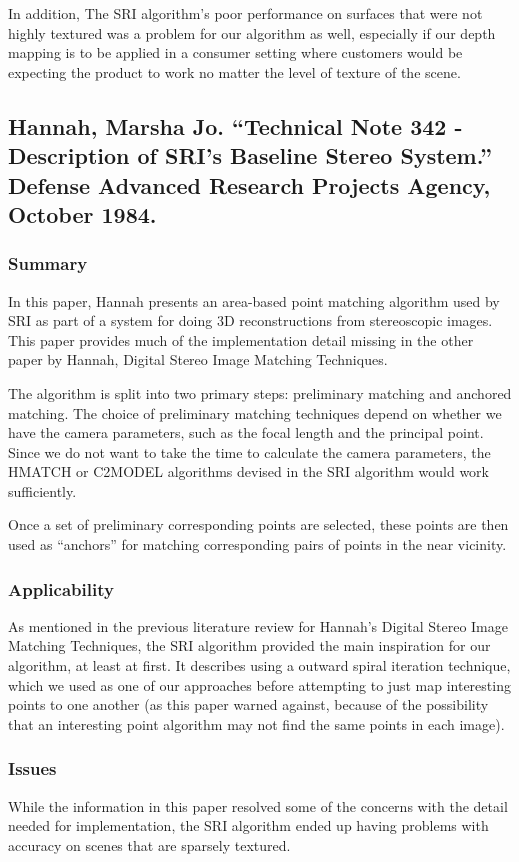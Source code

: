 In addition, The SRI algorithm's poor performance on surfaces that were not highly textured was a problem for our algorithm as well, especially if our depth mapping is to be applied in a consumer setting where customers would be expecting the product to work no matter the level of texture of the scene. 


\subsection{Hannah, Marsha Jo. ``Technical Note 342 - Description of SRI's Baseline Stereo System.'' Defense Advanced Research Projects Agency, October 1984. }

\subsubsection{Summary}
In this paper, Hannah presents an area-based point matching algorithm used by SRI as part of a system for doing 3D reconstructions from stereoscopic images. This paper provides much of the implementation detail missing in the other paper by Hannah, Digital Stereo Image Matching Techniques. 

The algorithm is split into two primary steps: preliminary matching and anchored matching. The choice of preliminary matching techniques depend on whether we have the camera parameters, such as the focal length and the principal point. Since we do not want to take the time to calculate the camera parameters, the HMATCH or C2MODEL algorithms devised in the SRI algorithm would work sufficiently. 

Once a set of preliminary corresponding points are selected, these points are then used as ``anchors'' for matching corresponding pairs of points in the near vicinity.  

\subsubsection{Applicability}
As mentioned in the previous literature review for Hannah's Digital Stereo Image Matching Techniques, the SRI algorithm provided the main inspiration for our algorithm, at least at first.  It describes using a outward spiral iteration technique, which we used as one of our approaches before attempting to just map interesting points to one another (as this paper warned against, because of the possibility that an interesting point algorithm may not find the same points in each image).

\subsubsection{Issues}
While the information in this paper resolved some of the concerns with the detail needed for implementation, the SRI algorithm ended up having problems with accuracy on scenes that are sparsely textured. 

